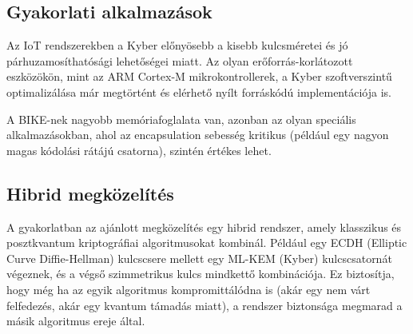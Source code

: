 \subsection{Gyakorlati alkalmazások}

Az IoT rendszerekben a Kyber előnyösebb a kisebb kulcsméretei és jó 
párhuzamosíthatósági lehetőségei miatt. Az olyan erőforrás-korlátozott 
eszközökön, mint az ARM Cortex-M mikrokontrollerek, a Kyber szoftverszintű 
optimalizálása már megtörtént és elérhető nyílt forráskódú implementációja is.

A BIKE-nek nagyobb memóriafoglalata van, azonban az olyan speciális alkalmazásokban, 
ahol az encapsulation sebesség kritikus (például egy nagyon magas kódolási rátájú 
csatorna), szintén értékes lehet.

\subsection{Hibrid megközelítés}

A gyakorlatban az ajánlott megközelítés egy hibrid rendszer, amely klasszikus 
és posztkvantum kriptográfiai algoritmusokat kombinál. Például egy ECDH (Elliptic Curve 
Diffie-Hellman) kulcscsere mellett egy ML-KEM (Kyber) kulcscsatornát végeznek, 
és a végső szimmetrikus kulcs mindkettő kombinációja. Ez biztosítja, hogy még 
ha az egyik algoritmus kompromittálódna is (akár egy nem várt felfedezés, 
akár egy kvantum támadás miatt), a rendszer biztonsága megmarad a másik algoritmus 
ereje által.

